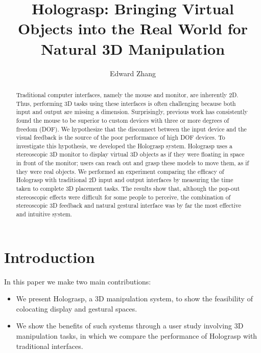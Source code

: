 \documentclass[pageno]{jpaper}
\begin{document}
\title{Holograsp: Bringing Virtual Objects into the Real World for Natural 3D Manipulation}

\date{}
\author{Edward Zhang}
\maketitle
\onehalfspace
\thispagestyle{empty}

\begin{abstract}
Traditional computer interfaces, namely the mouse and monitor, are inherently 2D. Thus, performing 3D tasks using
these interfaces is often challenging because both input and output are missing a dimension. Surprisingly,
previous work has consistently found the mouse to be superior to custom devices with three or more degrees
of freedom (DOF). We hypothesize that the disconnect between the input device and the visual feedback is the
source of the poor performance of high DOF devices. To investigate this hypothesis, we developed the Holograsp
system. Holograsp uses a stereoscopic 3D monitor to display virtual 3D objects as if they were floating in
space in front of the monitor; users can reach out and grasp these models to move them, as if they were real
objects. We performed an experiment comparing the efficacy of Holograsp with traditional 2D input and output
interfaces by measuring the time taken to complete 3D placement tasks. The results show that, although the
pop-out stereoscopic effects were difficult for some people to perceive, the combination of stereoscopic 3D
feedback and natural gestural interface was by far the most effective and intuitive system.
\end{abstract}

\newpage
\tableofcontents
\newpage

\section{Introduction}

In this paper we make two main contributions:
\begin{itemize}
\item We present Holograsp, a 3D manipulation system, to show the feasibility of colocating display and gestural spaces.
\item We show the benefits of such systems through a user study involving 3D manipulation tasks, in which we compare the
performance of Holograsp with traditional interfaces.
\end{itemize}
\end{document}

